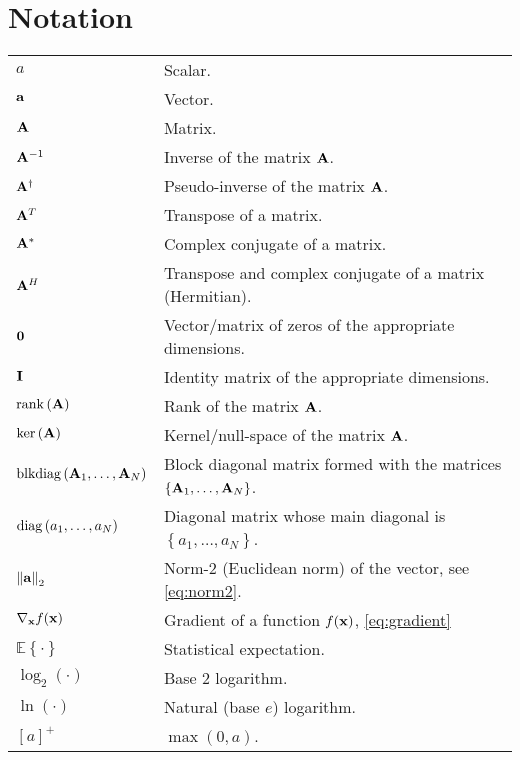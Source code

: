 \chapter*{Notation}

{ %
\renewcommand{\arraystretch}{1.5}

\begin{tabularx}{\textwidth}{lX}
$a$ & Scalar. \\
$\aa$ & Vector. \\
$\AA$ & Matrix. \\
$\AA^{-1}$ & Inverse of the matrix $\AA$. \\
$\AA^\dagger$ & Pseudo-inverse of the matrix $\AA$. \\
$\AA^T$ & Transpose of a matrix. \\
$\AA^\ast$ & Complex conjugate of a matrix. \\
$\AA^H$ & Transpose and complex conjugate of a matrix
    (Hermitian). \\
$\zero$ & Vector/matrix of zeros of the appropriate dimensions. \\
$\eye$ & Identity matrix of the appropriate dimensions. \\
$\rank\left(\AA\right)$ & Rank of the matrix $\AA$. \\
$\ker\left(\AA\right)$ & Kernel/null-space of the matrix $\AA$. \\
$\blkdiag\left(\AA_1, \ldots, \AA_N\right)$ & Block diagonal matrix
    formed with the matrices $\left\{\AA_1, \ldots, \AA_N\right\}$. \\
$\diag\left(a_1, \ldots, a_N\right)$ & Diagonal matrix whose main
    diagonal is $\left\{a_1, \ldots, a_N\right\}$. \\
$\left\|\aa\right\|_2$ & Norm-2 (Euclidean norm) of the vector, see
    \eqref{eq:norm2}. \\
$\nablabf_{\xx}f(\xx)$ & Gradient of a function $f(\xx)$,
    \eqref{eq:gradient} \\
$\mathbb{E}\left\{\cdot\right\}$ & Statistical expectation. \\
$\log_2\left(\cdot\right)$ & Base 2 logarithm. \\
$\ln\left(\cdot\right)$ & Natural (base $e$) logarithm. \\
$\left[ a \right]^+$ & $\max\left( 0,a \right)$.
\end{tabularx}

}
